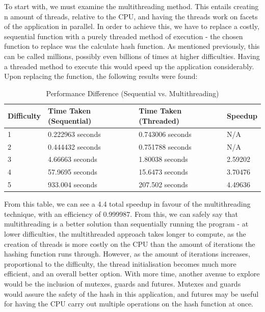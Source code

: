 \documentclass[12pt, a4paper]{article}
\begin{document}
To start with, we must examine the multithreading method. This entails creating n amount of threads, relative to the CPU, and having the threads work on facets of the application in parallel. In order to achieve this, we have to replace a costly, sequential function with a purely threaded method of execution - the chosen function to replace was the calculate hash function. As mentioned previously, this can be called millions, possibly even billions of times at higher difficulties. Having a threaded method to execute this would speed up the application considerably. Upon replacing the function, the following results were found:

\begin{table}[H]
    \centering
    \begin{tabular}{| l | l | l | l |}
    \hline
    Difficulty & Time Taken (Sequential) & Time Taken (Threaded) & Speedup\\ \hline
    1 & 0.222963 seconds & 0.743006 seconds & N/A\\ \hline
    2 & 0.444432 seconds & 0.751788 seconds & N/A\\ \hline
    3 & 4.66663 seconds & 1.80038 seconds & 2.59202\\ \hline
    4 & 57.9695 seconds & 15.6473 seconds & 3.70476\\ \hline
    5 & 933.004 seconds & 207.502 seconds & 4.49636\\ \hline
    \end{tabular}
    \caption{Performance Difference (Sequential vs. Multithreading)}
\end{table}

From this table, we can see a 4.4 total speedup in favour of the multithreading technique, with an efficiency of 0.999987. From this, we can safely say that multithreading is a better solution than sequentially running the program - at lower difficulties, the multithreaded approach takes longer to compute, as the creation of threads is more costly on the CPU than the amount of iterations the hashing function runs through. However, as the amount of iterations increases, proportional to the difficulty, the thread initialisation becomes much more efficient, and an overall better option. With more time, another avenue to explore would be the inclusion of mutexes, guards and futures. Mutexes and guards would assure the safety of the hash in this application, and futures may be useful for having the CPU carry out multiple operations on the hash function at once. \\
\end{document}
